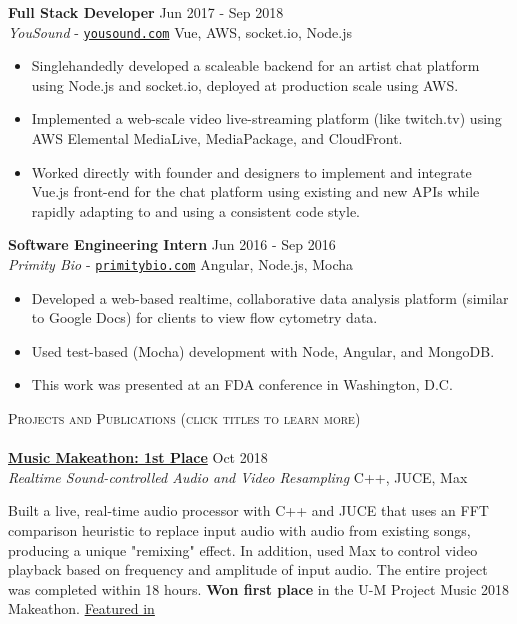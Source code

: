 \documentclass[11pt]{extarticle}
\newcommand{\lineunder} {
	\vspace*{-8pt} \\
	\hspace*{-18pt} \hrulefill \\
}
\newcommand{\header} [1] {
	{\hspace*{-18pt}\vspace*{6pt} \textsc{#1}}
	\vspace*{-6pt} \lineunder
}
\begin{document}
\noindent
\textbf{Full Stack Developer} \hfill Jun 2017 - Sep 2018\\
\textit{YouSound} - \href{https://yousound.com/}{\texttt{yousound.com}} \hfill Vue, AWS, socket.io, Node.js \\
\vspace{-6mm}
\begin{itemize} \itemsep 0.1pt
	\item Singlehandedly developed a scaleable backend for an artist chat platform using Node.js and socket.io, deployed at production scale using AWS.
	\item Implemented a web-scale video live-streaming platform (like twitch.tv) using AWS Elemental MediaLive, MediaPackage, and CloudFront.
    \item Worked directly with founder and designers to implement and integrate Vue.js front-end for the chat platform using existing and new APIs while rapidly adapting to and using a consistent code style.
\end{itemize}

\noindent
\textbf{Software Engineering Intern} \hfill Jun 2016 - Sep 2016\\
\textit{Primity Bio} - \href{https://primitybio.com}{\texttt{primitybio.com}} \hfill Angular, Node.js, Mocha \\
\vspace{-6mm}
\begin{itemize} \itemsep 0.1pt
	\item Developed a web-based realtime, collaborative data analysis platform (similar to Google Docs) for clients to view flow cytometry data.
	\item Used test-based (Mocha) development with Node, Angular, and MongoDB.
	\item This work was presented at an FDA conference in Washington, D.C.
\end{itemize}

\newpage
\noindent
\header{Projects and Publications (click titles to learn more)}
\noindent
\href{https://github.com/nacgarg/music-makeathon}{\textbf{Music Makeathon: 1st Place}} \hfill Oct 2018\\
\textit{Realtime Sound-controlled Audio and Video Resampling} \hfill C++, JUCE, Max \\
\vspace{-25pt}
\begin{paragraph}{}
	 Built a live, real-time audio processor with C++ and JUCE that uses an FFT comparison heuristic to replace input audio with audio from existing songs, producing a unique "remixing" effect. In addition, used Max to control video playback based on frequency and amplitude of input audio. The entire project was completed within 18 hours. \textbf{Won first place} in the U-M Project Music 2018 Makeathon.
	 \href{https://news.engin.umich.edu/2018/12/hacking-the-perfect-melody/}{Featured in \color{blue}{U-M Engineering Newsletter.}} \\
\end{paragraph}
\end{document}
